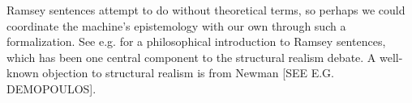 \documentclass[11pt, oneside]{article}   	%
\begin{document}
Ramsey sentences attempt to do without theoretical terms, so perhaps we could coordinate the machine's epistemology with our own through such a formalization.  See e.g. \citep[\S 26]{Carnap1966} for a philosophical introduction to Ramsey sentences, which has been one central component to the structural realism debate.  A well-known objection to structural realism is from Newman [SEE E.G. DEMOPOULOS].  







  


\end{document}
